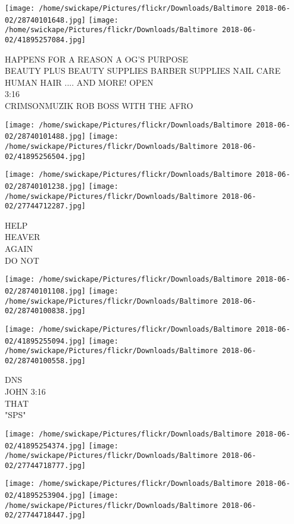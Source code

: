 \documentclass[10pt,letterpaper]{article}
\begin{document}
\texttt{[image: /home/swickape/Pictures/flickr/Downloads/Baltimore 2018-06-02/28740101648.jpg]}
\texttt{[image: /home/swickape/Pictures/flickr/Downloads/Baltimore 2018-06-02/41895257084.jpg]}

HAPPENS FOR A REASON A OG'S PURPOSE\\
BEAUTY PLUS BEAUTY SUPPLIES BARBER SUPPLIES NAIL CARE HUMAN HAIR .... AND MORE!  OPEN\\
3:16\\
CRIMSONMUZIK ROB BOSS WITH THE AFRO\\
\pagebreak

\texttt{[image: /home/swickape/Pictures/flickr/Downloads/Baltimore 2018-06-02/28740101488.jpg]}
\texttt{[image: /home/swickape/Pictures/flickr/Downloads/Baltimore 2018-06-02/41895256504.jpg]}

\texttt{[image: /home/swickape/Pictures/flickr/Downloads/Baltimore 2018-06-02/28740101238.jpg]}
\texttt{[image: /home/swickape/Pictures/flickr/Downloads/Baltimore 2018-06-02/27744712287.jpg]}

HELP\\
HEAVER\\
AGAIN\\
DO NOT\\
\pagebreak

\texttt{[image: /home/swickape/Pictures/flickr/Downloads/Baltimore 2018-06-02/28740101108.jpg]}
\texttt{[image: /home/swickape/Pictures/flickr/Downloads/Baltimore 2018-06-02/28740100838.jpg]}

\texttt{[image: /home/swickape/Pictures/flickr/Downloads/Baltimore 2018-06-02/41895255094.jpg]}
\texttt{[image: /home/swickape/Pictures/flickr/Downloads/Baltimore 2018-06-02/28740100558.jpg]}

DNS\\
JOHN 3:16\\
THAT\\
"SPS"\\
\pagebreak

\texttt{[image: /home/swickape/Pictures/flickr/Downloads/Baltimore 2018-06-02/41895254374.jpg]}
\texttt{[image: /home/swickape/Pictures/flickr/Downloads/Baltimore 2018-06-02/27744718777.jpg]}

\texttt{[image: /home/swickape/Pictures/flickr/Downloads/Baltimore 2018-06-02/41895253904.jpg]}
\texttt{[image: /home/swickape/Pictures/flickr/Downloads/Baltimore 2018-06-02/27744718447.jpg]}
\end{document}
